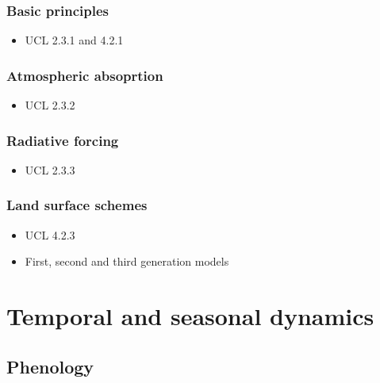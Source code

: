 \documentclass[
  oneside]{book}
\providecommand{\tightlist}{%
  \setlength{\itemsep}{0pt}\setlength{\parskip}{0pt}}
\begin{document}
\hypertarget{basic-principles}{%
\subsection{Basic principles}\label{basic-principles}}

\begin{itemize}
\tightlist
\item
  UCL 2.3.1 and 4.2.1
\end{itemize}

\hypertarget{atmospheric-absoprtion}{%
\subsection{Atmospheric absoprtion}\label{atmospheric-absoprtion}}

\begin{itemize}
\tightlist
\item
  UCL 2.3.2
\end{itemize}

\hypertarget{radiative-forcing}{%
\subsection{Radiative forcing}\label{radiative-forcing}}

\begin{itemize}
\tightlist
\item
  UCL 2.3.3
\end{itemize}

\hypertarget{land-surface-schemes}{%
\subsection{Land surface schemes}\label{land-surface-schemes}}

\begin{itemize}
\tightlist
\item
  UCL 4.2.3
\item
  First, second and third generation models
\end{itemize}

\hypertarget{temporal-and-seasonal-dynamics}{%
\chapter{Temporal and seasonal dynamics}\label{temporal-and-seasonal-dynamics}}


\hypertarget{phenology}{%
\section{Phenology}\label{phenology}}
\end{document}
